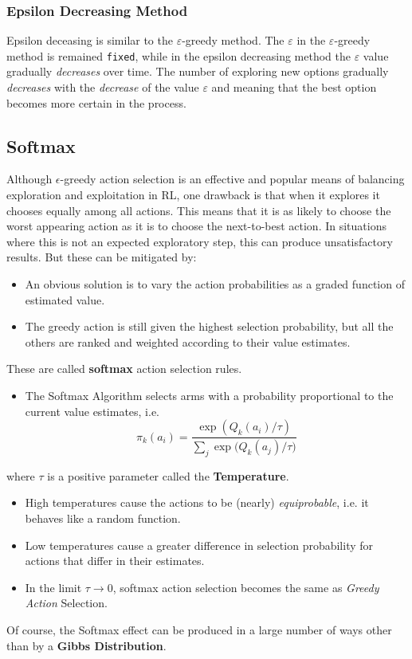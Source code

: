 \subsubsection{Epsilon Decreasing Method}
Epsilon deceasing is similar to the $\varepsilon$-greedy method.
The $\varepsilon$ in the $\varepsilon$-greedy method is remained \texttt{fixed}, while in the epsilon decreasing method the $\varepsilon$ value gradually \textit{decreases} over time.
The number of exploring new options gradually \textit{decreases} with the \textit{decrease} of the value $\varepsilon$ and meaning that the best option becomes more certain in the process.


\subsection{Softmax}
Although $\epsilon$-greedy action selection is an effective and popular means of balancing exploration and exploitation in RL, one drawback is that when it explores it chooses equally among all actions.
This means that it is as likely to choose the worst appearing action as it is to choose the next-to-best action.
In situations where this is not an expected exploratory step, this can produce unsatisfactory results.
But these can be mitigated by:
\begin{itemize}
    \item An obvious solution is to vary the action probabilities as a graded function of estimated value.
    \item The greedy action is still given the highest selection probability, but all the others are ranked and weighted according to their value estimates.
\end{itemize}
These are called \textbf{softmax} action selection rules.

\begin{itemize}
    \item The Softmax Algorithm selects arms with a probability proportional to the current value estimates, i.e.
    $$\pi_k (a_i) = \frac{\exp{(Q_k(a_i)/\tau)}}{\sum_j \exp{(Q_k(a_j)} / \tau)}$$
\end{itemize}
where $\tau$ is a positive parameter called the \textbf{Temperature}.
\begin{itemize}
    \item High temperatures cause the actions to be (nearly) \textit{equiprobable}, i.e. it behaves like a random function.
    \item Low temperatures cause a greater difference in selection probability for actions that differ in their estimates.
    \item In the limit $\tau \rightarrow 0$, softmax action selection becomes the same as \textit{Greedy Action} Selection.
\end{itemize}
Of course, the Softmax effect can be produced in a large number of ways other than by a \textbf{Gibbs Distribution}.

